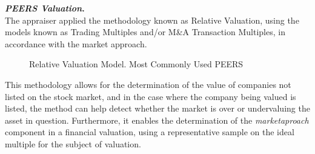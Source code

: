\textcolor{secundario}{\textbf{\textit{PEERS Valuation}.}}\\[5pt]

The appraiser applied the methodology known as Relative Valuation, using the models known as Trading Multiples and/or  M\&A Transaction Multiples, in accordance with the market approach.\\




%
%
\begin{figure}[H]
\caption{Relative Valuation Model. Most Commonly Used PEERS\label{fig:peers1}}\vspace{5pt}
       \hfill
\end{figure}

 
 This methodology allows for the determination of the value of companies not listed on the stock market, and in the case where the company being valued is listed, the method can help detect whether the market is over or undervaluing the asset in question. Furthermore, it enables the determination of the \textit{\gls{marketaproach}} component in a financial valuation, using a representative sample on the ideal multiple for the subject of valuation.\\

 